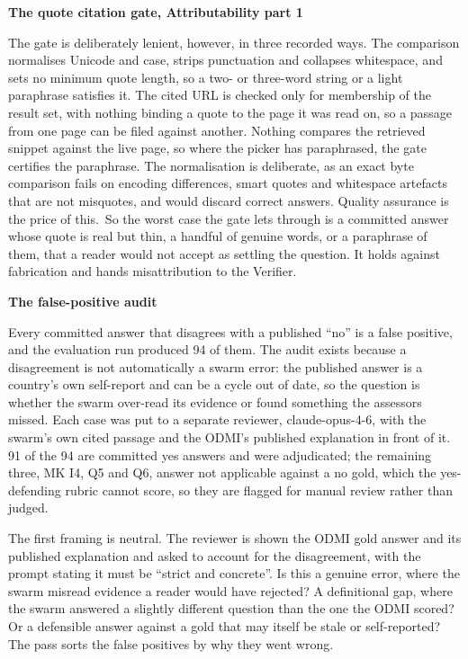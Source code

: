 \textbf{The quote citation gate, Attributability part 1}

The gate is deliberately lenient, however, in three recorded ways. The comparison normalises Unicode and case, strips punctuation and collapses whitespace, and sets no minimum quote length, so a two- or three-word string or a light paraphrase satisfies it. The cited URL is checked only for membership of the result set, with nothing binding a quote to the page it was read on, so a passage from one page can be filed against another. Nothing compares the retrieved snippet against the live page, so where the picker has paraphrased, the gate certifies the paraphrase. The normalisation is deliberate, as an exact byte comparison fails on encoding differences, smart quotes and whitespace artefacts that are not misquotes, and would discard correct answers. Quality assurance is the price of this.~So the worst case the gate lets through is a committed answer whose quote is real but thin, a handful of genuine words, or a paraphrase of them, that a reader would not accept as settling the question. It holds against fabrication and hands misattribution to the Verifier.

\textbf{The false-positive audit}

Every committed answer that disagrees with a published ``no'' is a false positive, and the evaluation run produced 94 of them. The audit exists because a disagreement is not automatically a swarm error: the published answer is a country's own self-report and can be a cycle out of date, so the question is whether the swarm over-read its evidence or found something the assessors missed. Each case was put to a separate reviewer, \mbox{claude-opus-4-6}, with the swarm's own cited passage and the ODMI's published explanation in front of it. 91 of the 94 are committed yes answers and were adjudicated; the remaining three, MK I4, Q5 and Q6, answer not applicable against a no gold, which the yes-defending rubric cannot score, so they are flagged for manual review rather than judged.

The first framing is neutral. The reviewer is shown the ODMI gold answer and its published explanation and asked to account for the disagreement, with the prompt stating it must be ``strict and concrete''. Is this a genuine error, where the swarm misread evidence a reader would have rejected? A definitional gap, where the swarm answered a slightly different question than the one the ODMI scored? Or a defensible answer against a gold that may itself be stale or self-reported? The pass sorts the false positives by why they went wrong.

